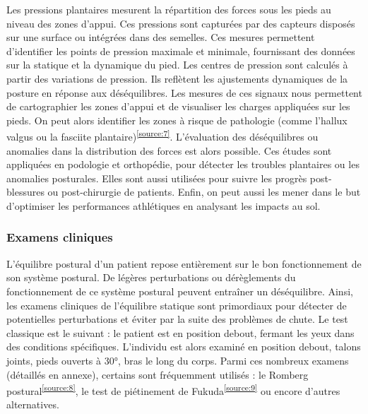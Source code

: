Les pressions plantaires mesurent la répartition des forces sous les pieds au niveau des zones d’appui. 
Ces pressions sont capturées par des capteurs disposés 
sur une surface ou intégrées dans des semelles. Ces mesures permettent d’identifier les points de pression maximale et minimale, fournissant des données sur la statique et la dynamique du pied.
Les centres de pression sont calculés à partir des variations de pression. 
Ils reflètent les ajustements dynamiques de la posture en réponse aux déséquilibres. 
Les mesures de ces signaux nous permettent de cartographier les zones d'appui et de visualiser les charges appliquées sur les pieds. 
On peut alors identifier les zones à risque de pathologie (comme l’hallux valgus ou la fasciite plantaire)\textsuperscript{\ref{source:7}}. 
L'évaluation des déséquilibres ou anomalies dans la distribution des forces est alors possible. 
Ces études sont appliquées en podologie et orthopédie, pour détecter les troubles plantaires ou les anomalies posturales. 
Elles sont aussi utilisées pour suivre les progrès post-blessures ou post-chirurgie de patients. 
Enfin, on peut aussi les mener dans le but d’optimiser les performances athlétiques en analysant les impacts au sol.

\subsubsection{Examens cliniques}

L’équilibre postural d’un patient repose entièrement sur le bon fonctionnement de son système postural. 
De légères perturbations ou dérèglements du fonctionnement de ce système postural peuvent  entraîner un déséquilibre. 
Ainsi, les examens cliniques de l’équilibre statique sont primordiaux pour détecter de potentielles perturbations et éviter par la suite des problèmes de chute. 
Le test classique est le suivant :  le patient est en position debout, fermant les yeux dans des conditions spécifiques.  
L’individu est alors examiné en position debout, talons joints, pieds ouverts à 30°, bras le long du corps. 
Parmi ces nombreux examens (détaillés en annexe), certains sont fréquemment utilisés : le Romberg postural\textsuperscript{\ref{source:8}}, le test de piétinement de Fukuda\textsuperscript{\ref{source:9}} ou encore d’autres alternatives. 

